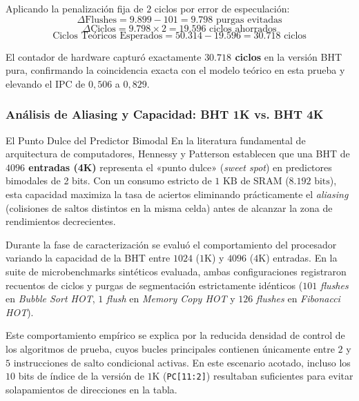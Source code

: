 \documentclass[10pt,a4paper]{article}
\begin{document}
Aplicando la penalización fija de $2$ ciclos por error de especulación:
\begin{equation}
    \Delta \text{Flushes} = 9.899 - 101 = 9.798 \text{ purgas evitadas}
\end{equation}
\begin{equation}
    \Delta \text{Ciclos} = 9.798 \times 2 = 19.596 \text{ ciclos ahorrados}
\end{equation}
\begin{equation}
    \text{Ciclos Teóricos Esperados} = 50.314 - 19.596 = 30.718 \text{ ciclos}
\end{equation}

El contador de hardware capturó exactamente \textbf{$30.718$ ciclos} en la versión BHT pura, confirmando la coincidencia exacta con el modelo teórico en esta prueba 
y elevando el IPC de $0,506$ a $0,829$.

\subsubsection{Análisis de Aliasing y Capacidad: BHT 1K vs. BHT 4K}
\begin{conceptbox}{El Punto Dulce del Predictor Bimodal}
    En la literatura fundamental de arquitectura de computadores, Hennessy y Patterson establecen que una BHT de \textbf{$4096$ entradas (4K)} representa el «punto 
    dulce» \cite{hennessy2025} (\textit{sweet spot}) en predictores bimodales de 2 bits. Con un consumo estricto de $1\text{ KB}$ de SRAM ($8.192\text{ bits}$), esta 
    capacidad maximiza la tasa de aciertos eliminando prácticamente el \textit{aliasing} (colisiones de saltos distintos en la misma celda) antes de alcanzar la zona 
    de rendimientos decrecientes.
\end{conceptbox}

Durante la fase de caracterización se evaluó el comportamiento del procesador variando la capacidad de la BHT entre $1024$ ($1\text{K}$) y $4096$ ($4\text{K}$) 
entradas. En la suite de microbenchmarks sintéticos evaluada, ambas configuraciones registraron recuentos de ciclos y purgas de segmentación estrictamente idénticos 
($101$ \textit{flushes} en \textit{Bubble Sort HOT}, $1$ \textit{flush} en \textit{Memory Copy HOT} y $126$ \textit{flushes} en \textit{Fibonacci HOT}).

Este comportamiento empírico se explica por la reducida densidad de control de los algoritmos de prueba, cuyos bucles principales contienen únicamente entre $2$ y $5$
instrucciones de salto condicional activas. En este escenario acotado, incluso los $10$ bits de índice de la versión de $1\text{K}$ (\texttt{PC[11:2]}) resultaban
suficientes para evitar solapamientos de direcciones en la tabla.
\end{document}
